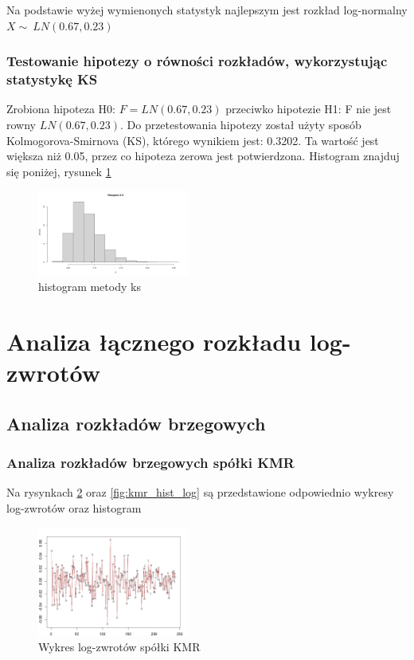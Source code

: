 \documentclass[a4paper,11pt]{article}
\begin{document}
Na podstawie wyżej wymienonych statystyk najlepszym jest rozkład log-normalny $X \sim\ LN(0.67, 0.23)$


\subsubsection{Testowanie hipotezy o równości rozkładów, wykorzystując statystykę KS}

Zrobiona hipoteza H0: $F=LN(0.67, 0.23)$ przeciwko hipotezie H1: F nie jest rowny $LN(0.67, 0.23)$. Do przetestowania hipotezy został użyty sposób Kolmogorova-Smirnova (KS), którego wynikiem jest: 0.3202. Ta wartość jest większa niż 0.05, przez co hipoteza zerowa jest potwierdzona. Histogram znajduj się poniżej, rysunek \ref{fig:jjb_hist_ks}


\begin{figure}[!htb]
	\centering
	\includegraphics[width=5cm]{hist2.jpg}
	\caption{histogram metody ks}
        \label{fig:jjb_hist_ks}
\end{figure}

\pagebreak
\section{Analiza łącznego rozkładu log-zwrotów}
\subsection{Analiza rozkładów brzegowych}
\subsubsection{Analiza rozkładów brzegowych spółki KMR}

Na rysynkach \ref{fig:kmr_wykres_log} oraz \ref{fig:kmr_hist_log} są przedstawione odpowiednio wykresy log-zwrotów oraz histogram
\begin{figure}[!htb]
	\centering
	\includegraphics[width=5cm]{kmr_wykres_log.png}
	\caption{Wykres log-zwrotów spółki KMR}
        \label{fig:kmr_wykres_log}
\end{figure}
\end{document}
